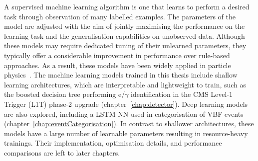 A supervised machine learning algorithm is one that learns to perform a desired task through observation of many labelled examples. The parameters of the model are adjusted with the aim of jointly maximising the performance on the learning task and the generalisation capabilities on unobserved data. Although these models may require dedicated tuning of their unlearned parameters, they typically offer a considerable improvement in performance over rule-based approaches. As a result, these models have been widely applied in particle physics~\cite{ml_in_hep}. The machine learning models trained in this thesis include shallow learning architectures, which are interpretable and lightweight to train, such as the boosted decision tree performing e/$\gamma$ identification in the CMS Level-1 Trigger (L1T) phase-2 upgrade (chapter~\ref{chap:detector}). Deep learning models are also explored, including a LSTM NN used in categorisation of VBF \Hee events (chapter~\ref{chap:eventCategorisation}). In contrast to shallower architectures, these models have a large number of learnable parameters resulting in resource-heavy trainings. Their implementation, optimisation details, and performance comparisons are left to later chapters.
